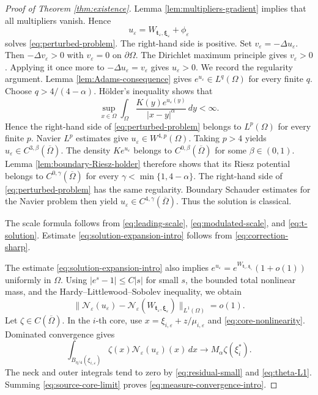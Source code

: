 \documentclass[11pt]{article}
\numberwithin{equation}{section}
\begin{document}
\begin{proof}[Proof of Theorem \ref{thm:existence}]
Lemma \ref{lem:multipliers-gradient} implies that all multipliers
vanish. Hence
\begin{equation*}
u_\varepsilon
=W_{\boldsymbol t_\varepsilon,\boldsymbol\xi_\varepsilon}
+\phi_\varepsilon
\end{equation*}
solves \eqref{eq:perturbed-problem}. The right-hand side is positive.
Set $v_\varepsilon=-\Delta u_\varepsilon$. Then
$-\Delta v_\varepsilon>0$ with $v_\varepsilon=0$ on
$\partial\Omega$. The Dirichlet maximum principle gives
$v_\varepsilon>0$. Applying it once more to
$-\Delta u_\varepsilon=v_\varepsilon$ gives
$u_\varepsilon>0$. We record the regularity argument. Lemma
\ref{lem:Adams-consequence} gives $e^{u_\varepsilon}\in L^q(\Omega)$
for every finite $q$. Choose $q>4/(4-\alpha)$. H\"older's inequality
shows that
\[
\sup_{x\in\Omega}\int_\Omega
\frac{K(y)e^{u_\varepsilon(y)}}{|x-y|^\alpha}\,dy<\infty.
\]
Hence the right-hand side of \eqref{eq:perturbed-problem} belongs to
$L^p(\Omega)$ for every finite $p$. Navier $L^p$ estimates give
$u_\varepsilon\in W^{4,p}(\Omega)$. Taking $p>4$ yields
$u_\varepsilon\in C^{3,\beta}(\overline\Omega)$. The density $K e^{u_\varepsilon}$ belongs to
$C^{0,\beta}(\overline\Omega)$ for some $\beta\in(0,1)$.
Lemma \ref{lem:boundary-Riesz-holder} therefore shows that its Riesz
potential belongs to $C^{0,\gamma}(\overline\Omega)$ for every
$\gamma<\min\{1,4-\alpha\}$. The right-hand side of
\eqref{eq:perturbed-problem} has the same regularity. Boundary
Schauder estimates for the Navier problem then yield
$u_\varepsilon\in C^{4,\gamma}(\overline\Omega)$. Thus the solution is
classical.

The scale formula follows from
\eqref{eq:leading-scale}, \eqref{eq:modulated-scale}, and
\eqref{eq:t-solution}. Estimate \eqref{eq:solution-expansion-intro}
follows from \eqref{eq:correction-sharp}.

The estimate \eqref{eq:solution-expansion-intro} also implies
$e^{u_\varepsilon}=e^{W_{\boldsymbol t_\varepsilon,
\boldsymbol\xi_\varepsilon}}(1+o(1))$ uniformly in $\Omega$. Using
$|e^s-1|\leq C|s|$ for small $s$, the bounded total nonlinear mass,
and the Hardy--Littlewood--Sobolev inequality, we obtain
\[
\|\mathcal N_\varepsilon(u_\varepsilon)
-\mathcal N_\varepsilon(W_{\boldsymbol t_\varepsilon,
\boldsymbol\xi_\varepsilon})\|_{L^1(\Omega)}=o(1).
\]
Let $\zeta\in C(\overline\Omega)$. In the $i$-th core, use
$x=\xi_{i,\varepsilon}+z/\mu_{i,\varepsilon}$ and
\eqref{eq:core-nonlinearity}. Dominated convergence gives
\begin{equation}\label{eq:source-core-limit}
\int_{B_{\eta/4}(\xi_{i,\varepsilon})}
\zeta(x)\mathcal N_\varepsilon(u_\varepsilon)(x)\,dx
\longrightarrow
M_\alpha\zeta(\xi_i^*).
\end{equation}
The neck and outer integrals tend to zero by
\eqref{eq:residual-small} and \eqref{eq:theta-L1}. Summing
\eqref{eq:source-core-limit} proves
\eqref{eq:measure-convergence-intro}.


\end{proof}
\end{document}
